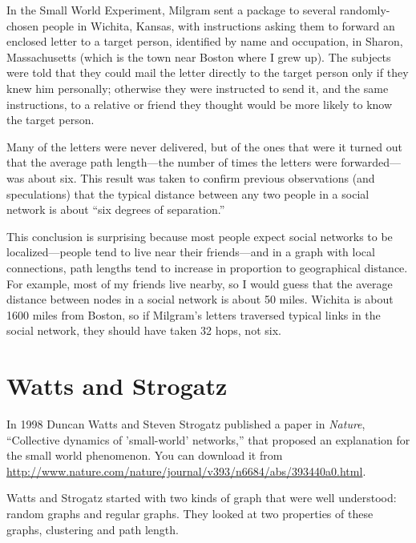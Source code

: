 \documentclass[10pt]{book}
\begin{document}
In the Small World Experiment, Milgram sent a package to several
randomly-chosen people in Wichita, Kansas, with instructions asking
them to forward an enclosed letter to a target person, identified by
name and occupation, in Sharon, Massachusetts (which is the town near
Boston where I grew up).  The subjects were told that they could mail
the letter directly to the target person only if they knew him
personally; otherwise they were instructed to send it, and the same
instructions, to a relative or friend they thought would be more
likely to know the target person.

Many of the letters were never delivered, but of the ones that
were it turned out that the average path length---the number of
times the letters were forwarded---was about six.  This result
was taken to confirm previous observations (and speculations) that
the typical distance between any two people in a social network
is about ``six degrees of separation.''

This conclusion is surprising because most people expect social
networks to be localized---people tend to live near their
friends---and in a graph with local connections, path lengths tend to
increase in proportion to geographical distance.  For example, most of
my friends live nearby, so I would guess that the average distance
between nodes in a social network is about 50 miles.  Wichita is about
1600 miles from Boston, so if Milgram's letters traversed typical
links in the social network, they should have taken 32 hops, not six.


\section{Watts and Strogatz}

In 1998 Duncan Watts and Steven Strogatz published a paper in {\em
  Nature}, ``Collective dynamics of 'small-world' networks,'' that
proposed an explanation for the small world phenomenon.  You can
download it from
\url{http://www.nature.com/nature/journal/v393/n6684/abs/393440a0.html}.
  

Watts and Strogatz started with two kinds of graph that were well
understood: random graphs and regular graphs.  They looked at two
properties of these graphs, clustering and path length.
\end{document}
